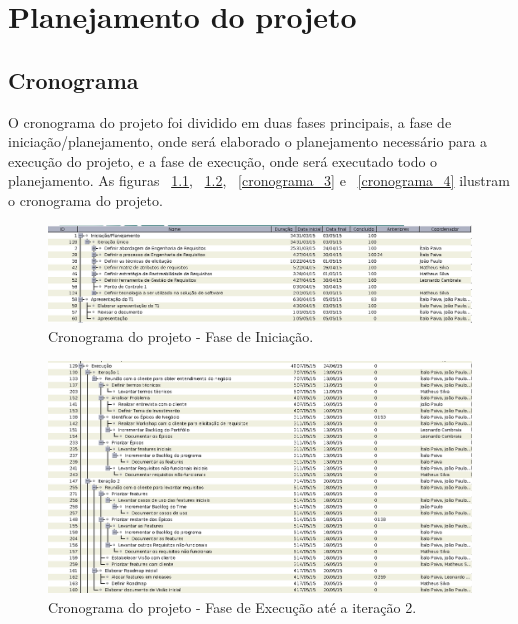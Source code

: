 \chapter[Planejamento do projeto]{Planejamento do projeto}

  \section{Cronograma}
  
   O cronograma do projeto foi dividido em duas fases principais, a fase de iniciação/planejamento, onde será elaborado o planejamento
   necessário para a execução do projeto, e a fase de execução, onde será executado todo o planejamento.
   As figuras ~\ref{cronograma_1}, ~\ref{cronograma_2}, ~\ref{cronograma_3} e ~\ref{cronograma_4} ilustram o cronograma do projeto.
   \vfill
  
  \pagebreak
  \begin{figure}[!htbp]
    \centering
    \includegraphics[scale=0.5, angle = 90]{editaveis/figuras/cronograma_1}
    \caption[Cronograma - Fase de Iniciação]{Cronograma do projeto - Fase de Iniciação.}
    \label{cronograma_1}
  \end{figure}
  
  \pagebreak
  \begin{figure}[!htbp]
    \centering
    \includegraphics[scale=0.5, angle = 90]{editaveis/figuras/cronograma_2}
    \caption[Cronograma - Fase de Execução]{Cronograma do projeto - Fase de Execução até a iteração 2.}
    \label{cronograma_2}
  \end{figure}
  
